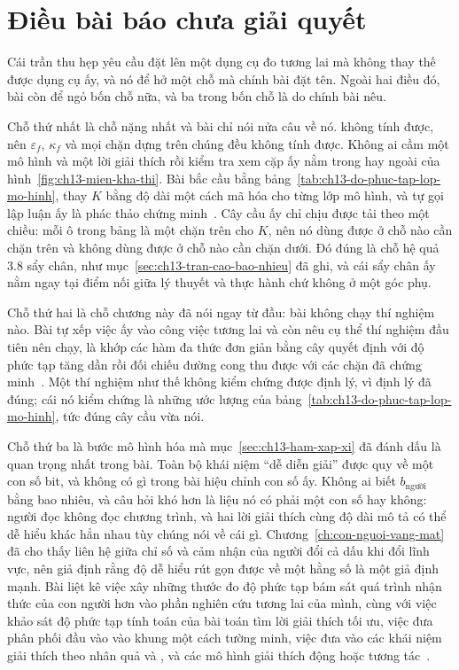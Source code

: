 \section{Điều bài báo chưa giải quyết}
\label{sec:ch13-dieu-chua-giai-quyet}

Cái trần thu hẹp yêu cầu đặt lên một dụng cụ đo tương lai mà không thay thế được
dụng cụ ấy, và nó để hở một chỗ mà chính bài đặt tên. Ngoài hai điều đó, bài còn
để ngỏ bốn chỗ nữa, và ba trong bốn chỗ là do chính bài nêu.

%
Chỗ thứ nhất là chỗ nặng nhất và bài chỉ nói nửa câu về nó.  không tính được, nên $\varepsilon_f$,
$\kappa_f$ và mọi chặn dựng trên chúng đều không tính được. Không ai cầm một mô
hình và một lời giải thích rồi kiểm tra xem cặp ấy nằm trong hay ngoài
 của
hình~\ref{fig:ch13-mien-kha-thi}. Bài bắc cầu bằng
bảng~\ref{tab:ch13-do-phuc-tap-lop-mo-hinh}, thay $K$ bằng độ dài một cách mã
hóa cho từng lớp mô hình, và tự gọi lập luận ấy là phác thảo chứng
minh~\autocite{p26limits}. Cây cầu ấy chỉ chịu được tải theo một chiều: mỗi ô
trong bảng là một chặn trên cho $K$, nên nó dùng được ở chỗ nào cần chặn trên và
không dùng được ở chỗ nào cần chặn dưới. Đó đúng là chỗ hệ quả 3.8 sẩy chân, như
mục~\ref{sec:ch13-tran-cao-bao-nhieu} đã ghi, và cái sẩy chân ấy nằm ngay tại
điểm nối giữa lý thuyết và thực hành chứ không ở một góc phụ.

Chỗ thứ hai là chỗ chương này đã nói ngay từ đầu: bài không chạy thí nghiệm nào.
Bài tự xếp việc ấy vào công việc tương lai và còn nêu cụ thể thí nghiệm đầu tiên
nên chạy, là khớp các hàm đa thức đơn giản bằng cây quyết định với độ phức tạp
tăng dần rồi đối chiếu đường cong thu được với các chặn đã
chứng minh~\autocite{p26limits}. Một thí nghiệm như thế không kiểm chứng được
định lý, vì định lý đã đúng; cái nó kiểm chứng là những ước lượng của
bảng~\ref{tab:ch13-do-phuc-tap-lop-mo-hinh}, tức đúng cây cầu vừa nói.

Chỗ thứ ba là bước mô hình hóa mà mục~\ref{sec:ch13-ham-xap-xi} đã đánh dấu là
quan trọng nhất trong bài. Toàn bộ khái niệm \enquote{dễ diễn giải} được quy về
một con số bit, và không có gì trong bài hiệu chỉnh con số ấy. Không ai biết
$b_{\text{người}}$ bằng bao nhiêu, và câu hỏi khó hơn là liệu nó có phải một con
số hay không: người đọc không đọc chương trình, và hai lời giải thích cùng độ
dài mô tả có thể dễ hiểu khác hẳn nhau tùy chúng nói về cái gì.
Chương~\ref{ch:con-nguoi-vang-mat} đã cho thấy liên hệ giữa chỉ số và cảm nhận
của người đổi cả dấu khi đổi lĩnh vực, nên giả định rằng độ dễ hiểu rút gọn được
về một hằng số là một giả định mạnh. Bài liệt kê việc xây những thước đo độ phức tạp bám sát quá trình nhận
thức của con người hơn vào phần nghiên cứu tương lai của mình, cùng với việc
khảo sát độ phức tạp tính toán của bài toán tìm lời giải thích tối ưu, việc đưa
phân phối đầu vào vào khung một cách tường minh, việc đưa vào các khái niệm giải
thích theo nhân quả và , và các mô hình giải thích
động hoặc tương tác~\autocite{p26limits}.

